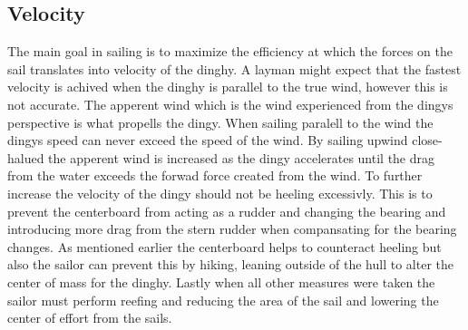 \subsection{Velocity}
The main goal in sailing is to maximize the efficiency at which the forces on the sail translates into velocity of the dinghy. A layman might expect that the fastest velocity is achived when the dinghy is parallel to the true wind, however this is not accurate. The apperent wind which is the wind experienced from the dingys perspective is what propells the dingy. When sailing paralell to the wind the dingys speed can never exceed the speed of the wind\cite{sail-force}. By sailing upwind close-halued the apperent wind is increased as the dingy accelerates until the drag from the water exceeds the forwad force created from the wind. To further increase the velocity of the dingy should not be heeling excessivly. This is to prevent the centerboard from acting as a rudder and changing the bearing and introducing more drag from the stern rudder when compansating for the bearing changes. As mentioned earlier the centerboard helps to counteract heeling but also the sailor can prevent this by hiking, leaning outside of the hull to alter the center of mass for the dinghy. Lastly when all other measures were taken the sailor must perform reefing and reducing the area of the sail and lowering the center of effort from the sails.